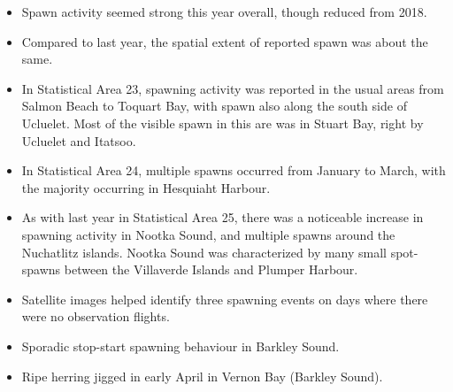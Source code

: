 \begin{itemize}
\item Spawn activity seemed strong this year overall, though reduced from 2018.
\item Compared to last year, the spatial extent of reported spawn was about the same.
\item In Statistical Area 23, spawning activity was reported in the usual areas from Salmon Beach to Toquart Bay, with spawn also along the south side of Ucluelet.
Most of the visible spawn in this are was in Stuart Bay, right by Ucluelet and Itatsoo.
\item In Statistical Area 24, multiple spawns occurred from January to March, with the majority occurring in Hesquiaht Harbour.
\item As with last year in Statistical Area 25, there was a noticeable increase in spawning activity in Nootka Sound, and multiple spawns around the Nuchatlitz islands.
Nootka Sound was characterized by many small spot-spawns between the Villaverde Islands and Plumper Harbour.
\item Satellite images helped identify three spawning events on days where there were no observation flights.
\item Sporadic stop-start spawning behaviour in Barkley Sound.
\item Ripe herring jigged in early April in Vernon Bay (Barkley Sound).
\end{itemize}